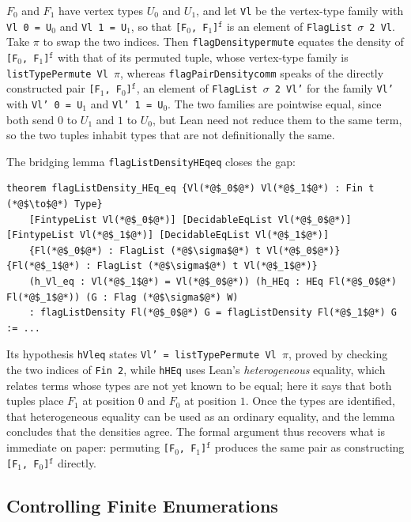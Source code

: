 \documentclass[acmsmall,screen=true,acmthm=false]{acmart}
\DeclareRobustCommand{\lean}[1]{{\def\_{\textunderscore\allowbreak}\texttt{#1}}}
\begin{document}
$F_0$ and $F_1$ have vertex types $U_0$ and $U_1$, and let \lean{Vl} be the
vertex-type family with \lean{Vl 0 = U}$_0$ and \lean{Vl 1 = U}$_1$, so that
\lean{[F}$_0$\lean{, F}$_1$\lean{]}$^{\mathtt{f}}$ is an element of
\lean{FlagList}~$\sigma$~\lean{2 Vl}.  Take $\pi$ to swap the two indices.
Then \lean{flagDensity\_permute} equates the density of
\lean{[F}$_0$\lean{, F}$_1$\lean{]}$^{\mathtt{f}}$ with that of its permuted
tuple, whose vertex-type family is \lean{listTypePermute Vl $\pi$}, whereas
\lean{flagPairDensity\_comm} speaks of the directly constructed pair
\lean{[F}$_1$\lean{, F}$_0$\lean{]}$^{\mathtt{f}}$, an element of
\lean{FlagList}~$\sigma$~\lean{2 Vl'} for the family \lean{Vl'} with
\lean{Vl' 0 = U}$_1$ and \lean{Vl' 1 = U}$_0$.  The two families are pointwise
equal, since both send $0$ to $U_1$ and $1$ to $U_0$, but Lean need not reduce
them to the same term, so the two tuples inhabit types that are not
definitionally the same.

The bridging lemma \lean{flagListDensity\_HEq\_eq} closes the gap:
\begin{lstlisting}
theorem flagListDensity_HEq_eq {Vl(*@$_0$@*) Vl(*@$_1$@*) : Fin t (*@$\to$@*) Type}
    [FintypeList Vl(*@$_0$@*)] [DecidableEqList Vl(*@$_0$@*)] [FintypeList Vl(*@$_1$@*)] [DecidableEqList Vl(*@$_1$@*)]
    {Fl(*@$_0$@*) : FlagList (*@$\sigma$@*) t Vl(*@$_0$@*)} {Fl(*@$_1$@*) : FlagList (*@$\sigma$@*) t Vl(*@$_1$@*)}
    (h_Vl_eq : Vl(*@$_1$@*) = Vl(*@$_0$@*)) (h_HEq : HEq Fl(*@$_0$@*) Fl(*@$_1$@*)) (G : Flag (*@$\sigma$@*) W)
    : flagListDensity Fl(*@$_0$@*) G = flagListDensity Fl(*@$_1$@*) G := ...
\end{lstlisting}
Its hypothesis \lean{h\_Vl\_eq} states \lean{Vl' = listTypePermute Vl $\pi$},
proved by checking the two indices of \lean{Fin 2}, while \lean{h\_HEq} uses
Lean's \emph{heterogeneous} equality, which relates terms whose types are not
yet known to be equal; here it says that both tuples place $F_1$ at position
$0$ and $F_0$ at position $1$.  Once the types are identified, that
heterogeneous equality can be used as an ordinary equality, and the lemma
concludes that the densities agree.  The
formal argument thus recovers what is immediate on paper: permuting
\lean{[F}$_0$\lean{, F}$_1$\lean{]}$^{\mathtt{f}}$ produces the same pair as
constructing \lean{[F}$_1$\lean{, F}$_0$\lean{]}$^{\mathtt{f}}$ directly.

\subsection{Controlling Finite Enumerations}
\label{sec:fintype}
\end{document}
